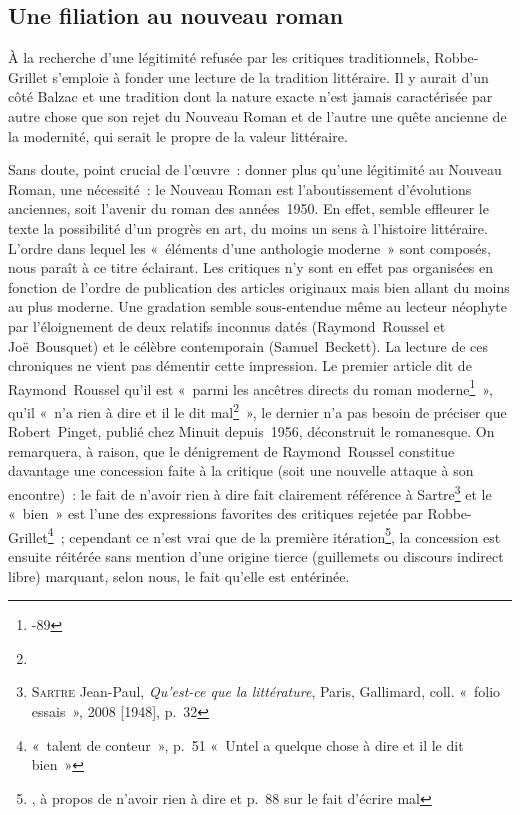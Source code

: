 \documentclass[12pt, a4paper]{article}
\begin{document}
\subsection{Une filiation au nouveau roman}
\label{filiation}
À la recherche d'une légitimité refusée par les critiques traditionnels, Robbe-Grillet s'emploie à fonder une lecture de la tradition littéraire. Il y aurait d'un côté Balzac et une tradition dont la nature exacte n'est jamais caractérisée par autre chose que son rejet du Nouveau Roman et de l'autre une quête ancienne de la modernité, qui serait le propre de la valeur littéraire.




Sans doute, point crucial de l'œuvre~: donner plus qu'une légitimité au Nouveau Roman, une nécessité~: le Nouveau Roman est l'aboutissement d'évolutions anciennes, soit l'avenir du roman des années~1950. En effet, semble effleurer le texte la possibilité d'un progrès en art, du moins un sens à l'histoire littéraire.
L'ordre dans lequel les «~éléments d'une anthologie moderne~» sont composés, nous paraît à ce titre éclairant. Les critiques n'y sont en effet pas organisées en fonction de l'ordre de publication des articles originaux mais bien allant du moins au plus moderne. Une gradation semble sous-entendue même au lecteur néophyte par l'éloignement de deux relatifs inconnus datés (Raymond~Roussel et Joë~Bousquet) et le célèbre contemporain (Samuel~Beckett). La lecture de ces chroniques ne vient pas démentir cette impression. Le premier article dit de Raymond~Roussel qu'il est «~parmi les ancêtres directs du roman moderne\footnote{-89}~», qu'il «~n’a rien à dire et il le dit mal\footnote{}~», le dernier n'a pas besoin de préciser que Robert~Pinget, publié chez Minuit depuis~1956, déconstruit le romanesque. On remarquera, à raison, que le dénigrement de Raymond~Roussel constitue davantage une concession faite à la critique (soit une nouvelle attaque à son encontre)~: le fait de n'avoir rien à dire fait clairement référence à Sartre\footnote{\textsc{Sartre} Jean-Paul, \textit{Qu'est-ce que la littérature}, Paris, Gallimard, coll. «~folio essais~», 2008 [1948], p.~32} et le «~bien~» est l'une des expressions favorites des critiques rejetée par Robbe-Grillet\footnote{ «~talent de conteur~», p.~51 «~Untel a quelque chose à dire et il le dit bien~»}~; cependant ce n'est vrai que de la première itération\footnote{, à propos de n'avoir rien à dire et p.~88 sur le fait d'écrire mal}, la concession est ensuite réitérée sans mention d'une origine tierce (guillemets ou discours indirect libre) marquant, selon nous, le fait qu'elle est entérinée.
\end{document}
